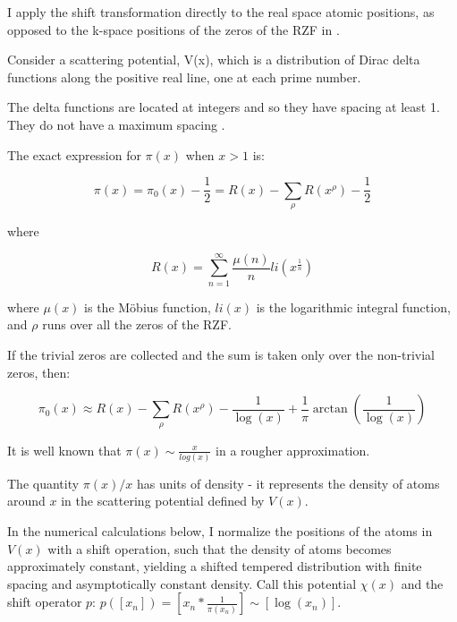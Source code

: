 \documentclass[11pt, oneside]{article}
\begin{document}
I apply the shift transformation directly to the real space atomic positions, as opposed to the k-space positions of the zeros of the RZF in \cite{Varma2016}.

Consider a scattering potential, V(x), which is a distribution of Dirac delta functions along the positive real line, one at each prime number.
 
The delta functions are located at integers and so they have spacing at least 1. They do not have a maximum spacing \cite{Westzynthius1931, Erdos1950}.

The exact expression \cite{Riemann1859} for $\pi(x)$ when $x>1$ is:

\begin{equation}
\pi(x) = \pi_0(x) - \frac{1}{2} = R(x) - \sum_{\rho}R(x^{\rho}) - \frac{1}{2}
\end{equation}

where

\begin{equation}
R(x) = \sum_{n=1}^{\infty}\frac{\mu(n)}{n}li(x^{\frac{1}{n}})
\end{equation}

where $\mu(x)$ is the M\"obius function, $li(x)$ is the logarithmic integral function, and $\rho$ runs over all the zeros of the RZF.

If the trivial zeros are collected and the sum is taken only over the non-trivial zeros, then:

\begin{equation}
\pi_0(x) \approx R(x) - \sum_{\rho}R(x^{\rho}) - \frac{1}{\log(x)} + \frac{1}{\pi}\arctan(\frac{1}{\log(x)})
\end{equation}
 
It is well known that $\pi(x) \sim \frac{x}{log(x)}$ in a rougher approximation.

The quantity $\pi(x)/x$ has units of density - it represents the density of atoms around $x$ in the scattering potential defined by $V(x)$.

In the numerical calculations below, I normalize the positions of the atoms in $V(x)$ with a shift operation, such that the density of atoms becomes approximately constant, yielding a shifted tempered distribution with finite spacing and asymptotically constant density. Call this potential $\chi(x)$ and the shift operator $p$: $p([x_n]) = [x_n * \frac{1}{\pi(x_n)}] \sim [\log(x_n)]$.

\end{document}
